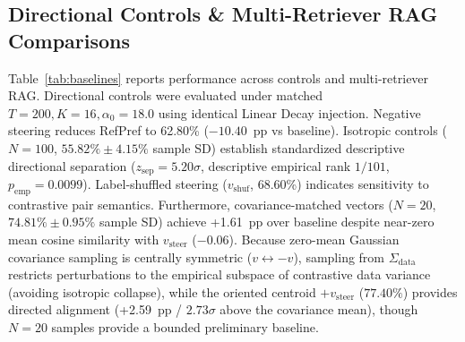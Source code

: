 \documentclass[runningheads]{llncs}
\begin{document}
\subsection{Directional Controls \& Multi-Retriever RAG Comparisons}\label{sec:baselines_rag}
Table~\ref{tab:baselines} reports performance across controls and multi-retriever RAG. Directional controls were evaluated under matched $T=200, K=16, \alpha_0=18.0$ using identical Linear Decay injection. Negative steering reduces RefPref to 62.80\% ($-10.40$~pp vs baseline). Isotropic controls ($N=100$, $55.82\% \pm 4.15\%$ sample SD) establish standardized descriptive directional separation ($z_{\text{sep}}=5.20\sigma$, descriptive empirical rank $1/101$, $p_{\text{emp}} = 0.0099$). Label-shuffled steering ($v_{\text{shuf}}$, 68.60\%) indicates sensitivity to contrastive pair semantics. Furthermore, covariance-matched vectors ($N=20$, $74.81\% \pm 0.95\%$ sample SD) achieve +1.61~pp over baseline despite near-zero mean cosine similarity with $v_{\text{steer}}$ ($-0.06$). Because zero-mean Gaussian covariance sampling is centrally symmetric ($v \leftrightarrow -v$), sampling from $\Sigma_{\text{data}}$ restricts perturbations to the empirical subspace of contrastive data variance (avoiding isotropic collapse), while the oriented centroid $+v_{\text{steer}}$ ($77.40\%$) provides directed alignment (+2.59~pp / $2.73\sigma$ above the covariance mean), though $N=20$ samples provide a bounded preliminary baseline.
\end{document}
